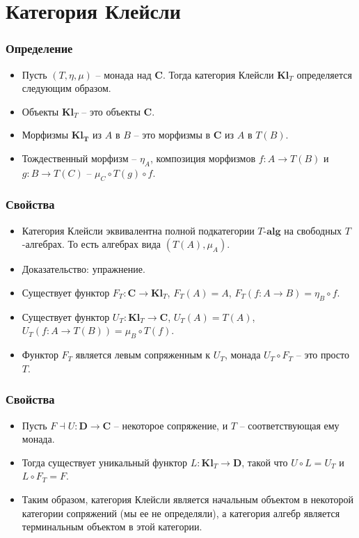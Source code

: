 \documentclass{beamer}
\theoremstyle{definition}
\newcommand{\cat}[1]{\mathbf{#1}}
\renewcommand{\C}{\cat{C}}
\newcommand{\D}{\cat{D}}
\begin{document}
\section{Категория Клейсли}

\begin{frame}
\frametitle{Определение}
\begin{itemize}
\item Пусть $(T, \eta, \mu)$ -- монада над $\C$. Тогда категория Клейсли $\cat{Kl}_T$ определяется следующим образом.
\item Объекты $\cat{Kl}_T$ -- это объекты $\C$.
\item Морфизмы $\cat{Kl_T}$ из $A$ в $B$ -- это морфизмы в $\C$ из $A$ в $T(B)$.
\item Тождественный морфизм -- $\eta_A$, композиция морфизмов $f : A \to T(B)$ и $g : B \to T(C)$ -- $\mu_C \circ T(g) \circ f$.
\end{itemize}
\end{frame}

\begin{frame}
\frametitle{Свойства}
\begin{itemize}
\item Категория Клейсли эквивалентна полной подкатегории $T\text{-}\cat{alg}$ на свободных $T$-алгебрах.
То есть алгебрах вида $(T(A), \mu_A)$.
\item Доказательство: упражнение.
\item Существует функтор $F_T : \C \to \cat{Kl}_T$, $F_T(A) = A$, $F_T(f : A \to B) = \eta_B \circ f$.
\item Существует функтор $U_T : \cat{Kl}_T \to \C$, $U_T(A) = T(A)$, $U_T(f : A \to T(B)) = \mu_B \circ T(f)$.
\item Функтор $F_T$ является левым сопряженным к $U_T$, монада $U_T \circ F_T$ -- это просто $T$.
\end{itemize}
\end{frame}

\begin{frame}
\frametitle{Свойства}
\begin{itemize}
\item Пусть $F \dashv U : \D \to \C$ -- некоторое сопряжение, и $T$ -- соответствующая ему монада.
\item Тогда существует уникальный функтор $L : \cat{Kl}_T \to \D$, такой что $U \circ L = U_T$ и $L \circ F_T = F$.
\item Таким образом, категория Клейсли является начальным объектом в некоторой категории сопряжений (мы ее не определяли), а категория алгебр является терминальным объектом в этой категории.
\end{itemize}
\end{frame}
\end{document}
